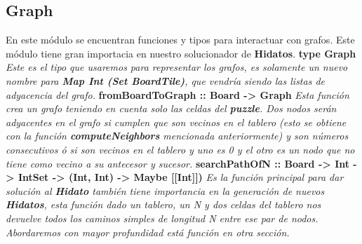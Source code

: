 \documentclass[12pt]{article}
\begin{document}
\subsection{Graph}
En este m\'odulo se encuentran funciones y tipos para interactuar con grafos. Este m\'odulo tiene gran importacia en nuestro solucionador de {\bf Hidatos}.
\newline \newline
{\bf type Graph}\newline
{\it Este es el tipo que usaremos para representar los grafos, es solamente un nuevo nombre para {\bf Map Int (Set BoardTile)}, que vendr\'ia siendo las listas de adyacencia del grafo.}
\newline \newline
{\bf fromBoardToGraph :: Board -> Graph}\newline
{\it Esta funci\'on crea un grafo teniendo en cuenta solo las celdas del {\bf puzzle}. Dos nodos ser\'an adyacentes en el grafo si cumplen que son vecinos en el tablero (esto se obtiene con la funci\'on
{\bf computeNeighbors} mencionada anteriormente) y son n\'umeros consecutivos \'o si son vecinos en el tablero y uno es 0 y el otro es un nodo que no tiene como vecino a su antecesor y sucesor.}
\newline \newline
{\bf searchPathOfN :: Board -> Int -> IntSet -> (Int, Int) -> Maybe [[Int]])}\newline
{\it Es la funci\'on principal para dar soluci\'on al {\bf Hidato} tambi\'en tiene importancia en la generaci\'on de nuevos {\bf Hidatos}, esta funci\'on dado un tablero, un N y dos celdas del tablero nos devuelve todos los caminos simples
de longitud N entre ese par de nodos. Abordaremos con mayor profundidad est\'a funci\'on en otra secci\'on.}
\newline \newline
\end{document}
